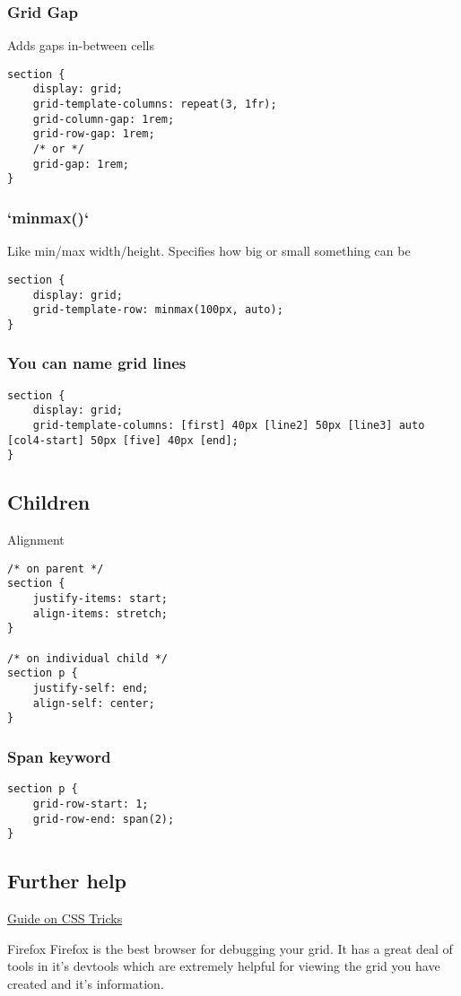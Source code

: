 \subsubsection{Grid Gap}

Adds gaps in-between cells

\begin{verbatim}
section {
	display: grid;
    grid-template-columns: repeat(3, 1fr);
    grid-column-gap: 1rem;
    grid-row-gap: 1rem;
    /* or */
	grid-gap: 1rem;
}
\end{verbatim}

\subsubsection{`minmax()`}

Like min/max width/height. Specifies how big or small something can be

\begin{verbatim}
section {
	display: grid;
	grid-template-row: minmax(100px, auto);
}
\end{verbatim}


\subsubsection{You can name grid lines}

\begin{verbatim}
section {
	display: grid;
	grid-template-columns: [first] 40px [line2] 50px [line3] auto [col4-start] 50px [five] 40px [end];
}
\end{verbatim}


\subsection{Children}

Alignment

\begin{verbatim}
/* on parent */
section {
	justify-items: start;
	align-items: stretch;
}

/* on individual child */
section p {
	justify-self: end;
	align-self: center;
}
\end{verbatim}

\subsubsection{Span keyword}

\begin{verbatim}
section p {
	grid-row-start: 1;
	grid-row-end: span(2);
}
\end{verbatim}

\subsection{Further help}

\href{}{Guide on CSS Tricks}

\begin{infobox}{Firefox}
    Firefox is the best browser for debugging your grid. It has a great deal of tools in it's devtools which are extremely helpful for viewing the grid you have created and it's information.
\end{infobox}

